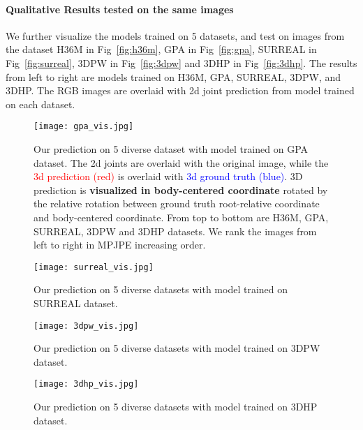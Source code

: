 \documentclass[runningheads]{llncs}
\begin{document}
\paragraph{Qualitative Results tested on the same images} We further visualize the models trained on 5 datasets, and test on images from the dataset H36M in Fig~\ref{fig:h36m}, GPA in Fig~\ref{fig:gpa},  SURREAL in Fig~\ref{fig:surreal}, 3DPW in Fig~\ref{fig:3dpw} and 3DHP in Fig~\ref{fig:3dhp}.  The results from left to right are models trained on H36M, GPA, SURREAL, 3DPW, and 3DHP.  The RGB images are overlaid with 2d joint prediction from model trained on each dataset. 


\begin{figure*}
\begin{center}
\texttt{[image: gpa\_vis.jpg]}
\end{center}
   \caption{Our prediction on 5 diverse dataset with model trained on GPA dataset. The 2d joints are overlaid with the original image, while the \textcolor{red}{3d prediction (red)} is overlaid with \textcolor{blue}{3d ground truth (blue)}. 3D prediction is \textbf{visualized in body-centered coordinate} rotated by the relative rotation between ground truth root-relative coordinate and body-centered coordinate. From top to bottom are H36M, GPA, SURREAL, 3DPW and 3DHP datasets. We rank the images from left to right in MPJPE increasing order.} 
\label{fig:qualitativeresults1}
\end{figure*}

\begin{figure*}
\begin{center}
\texttt{[image: surreal\_vis.jpg]}
\end{center}
   \caption{Our prediction on 5 diverse datasets with model trained on SURREAL dataset.} 
\label{fig:qualitativeresults2}
\end{figure*}


\begin{figure*}
\begin{center}
\texttt{[image: 3dpw\_vis.jpg]}
\end{center}
   \caption{Our prediction on 5 diverse datasets with model trained on 3DPW dataset.} 
\label{fig:qualitativeresults3}
\end{figure*}


\begin{figure*}
\begin{center}
\texttt{[image: 3dhp\_vis.jpg]}
\end{center}
   \caption{Our prediction on 5 diverse datasets with model trained on  3DHP dataset.} 
\label{fig:qualitativeresults4}
\end{figure*}
\end{document}

